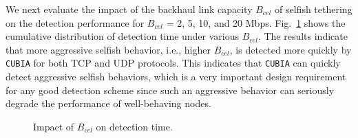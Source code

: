 We next evaluate the impact of the backhaul link capacity $B_{cel}$ of
selfish tethering on the detection performance
for $B_{cel}$ = 2, 5, 10, and 20\! Mbps.
%
Fig.~\ref{fig:impact_bcel} shows the cumulative distribution of detection
time under various $B_{cel}$. The results indicate that more aggressive
selfish behavior, i.e., higher $B_{cel}$, is detected more quickly by
{\tt CUBIA} for both TCP and UDP protocols.
%
This indicates that {\tt CUBIA} can quickly detect aggressive selfish
behaviors, which is a very important design requirement for any good
detection scheme since such an aggressive behavior can seriously
degrade the performance of well-behaving nodes.
%
\begin{figure} [ht]
\center
    \caption{Impact of $B_{cel}$ on detection time.}
    \label{fig:impact_bcel}
\end{figure}


